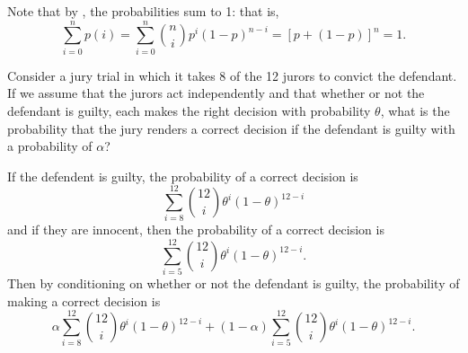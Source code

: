 Note that by , the probabilities sum to 1: that is, \[
    \sum^n_{i = 0} p(i) = \sum^n_{i = 0} \binom{n}{i}p^i(1 - p)^{n - i} = \left[ p + (1 - p) \right]^n = 1.    
\]
\begin{changebar}
    \begin{example}
        Consider a jury trial in which it takes 8 of the 12 jurors to convict the defendant. If we assume that the jurors act independently and that whether or not the defendant is guilty, each makes the right decision with probability $\theta$, what is the probability that the jury renders a correct decision if the defendant is guilty with a probability of $\alpha$?
    \end{example}
    \begin{solution}
        If the defendent is guilty, the probability of a correct decision is \[
            \sum_{i = 8}^{12} \binom{12}{i} \theta^i(1 - \theta)^{12 - i}    
        \] and if they are innocent, then the probability of a correct decision is \[
            \sum_{i = 5}^{12} \binom{12}{i} \theta^i(1 - \theta)^{12 - i}.    
        \] Then by conditioning on whether or not the defendant is guilty, the probability of making a correct decision is \[
            \alpha\sum^{12}_{i = 8} \binom{12}{i} \theta^i(1 - \theta)^{12 - i} + (1 - \alpha)\sum_{i = 5}^{12} \binom{12}{i} \theta^i(1 - \theta)^{12 - i}.    
        \]
    \end{solution}
\end{changebar}

